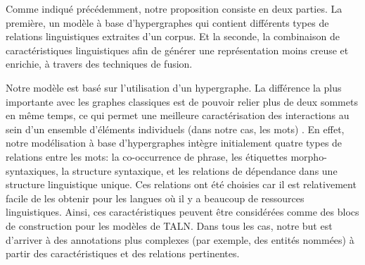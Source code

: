 \documentclass[a4paper,11pt,twoside]{article}
\begin{document}
%
%


Comme indiqué précédemment, notre proposition consiste en deux parties. La première, un modèle à base d'hypergraphes qui contient différents types de relations linguistiques extraites d'un corpus. Et la seconde, la combinaison de caractéristiques linguistiques afin de générer une représentation moins creuse et enrichie, à travers des techniques de fusion.

Notre modèle est basé sur l'utilisation d'un hypergraphe. La différence la plus importante avec les graphes classiques est de pouvoir relier plus de deux sommets en même temps, ce qui permet une meilleure caractérisation des interactions au sein d'un ensemble d'éléments individuels (dans notre cas, les mots) \cite{heintz2014beyond}. En effet, notre modélisation à base d'hypergraphes intègre initialement quatre types de relations entre les mots: la co-occurrence de phrase, les étiquettes morpho-syntaxiques, la structure syntaxique, et les relations de dépendance dans une structure linguistique unique. Ces relations ont été choisies car il est relativement facile de les obtenir pour les langues où il y a beaucoup de ressources linguistiques. Ainsi, ces caractéristiques peuvent être considérées comme des blocs de construction pour les modèles de TALN. Dans tous les cas, notre but est d'arriver à des annotations plus complexes (par exemple, des entités nommées) à partir des caractéristiques et des relations pertinentes.
\end{document}
